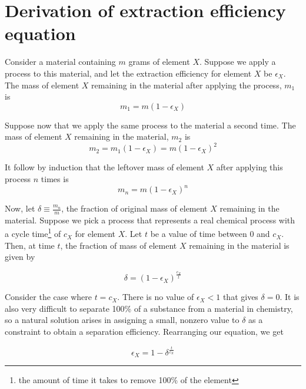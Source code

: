 \chapter{Derivation of extraction efficiency equation}
\label{appex:extraction-efficiency}

Consider a material containing $m$ grams of element $X$. Suppose we apply
a process to this material, and let the extraction efficiency for element $X$ be
$\epsilon_{X}$. The mass of element $X$ remaining in the material after applying
the process, $m_{1}$ is
\begin{equation}
   m_{1} = m(1-\epsilon_{X}) 
\end{equation}

Suppose now that we apply the same process to the material a second time. The mass of element $X$ remaining in the material, $m_{2}$ is 
\begin{equation}
    m_{2} = m_{1}(1-\epsilon_{X}) = m(1-\epsilon_{X})^{2}
\end{equation}

It follow by induction that the leftover mass of element $X$ after applying this
process $n$ times is
\begin{equation}
    m_{n} = m(1-\epsilon_{X})^{n}
\end{equation}

Now, let $\delta \equiv \frac{m_{n}}{m}$, the fraction of original mass of
element $X$ remaining in the material. Suppose we pick a process that represents
a real chemical process with a cycle time\footnote{the amount of time it takes
to remove 100\% of the element} of $c_{X}$ for element $X$. Let $t$ be a value
of time between 0 and $c_{X}$. Then, at time $t$, the fraction of mass
of element $X$ remaining in the material is given by

\begin{equation}
    \delta = (1-\epsilon_{X})^{\frac{c_{X}}{t}}
\end{equation}

Consider the case where $t=c_{X}$. There is no value of $\epsilon_{X} < 1$ that
gives $\delta = 0$. It is also very difficult to separate 100\% of a substance
from a material in chemistry, so a natural solution arises in assigning a small,
nonzero value to $\delta$ as a constraint to obtain a separation efficiency.
Rearranging our equation, we get

\begin{equation}
    \epsilon_{X} = 1 - \delta^{\frac{t}{c_{X}}}
\end{equation}

